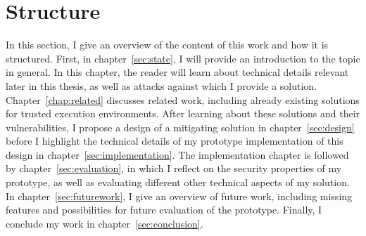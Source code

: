 \section{Structure}
\label{sec:10_structure}

In this section, I give an overview of the content of this work and how it is
structured. First, in chapter~\ref{sec:state}, I will provide an introduction to
the topic in general. In this chapter, the reader will learn about technical
details relevant later in this thesis, as well as attacks against which I
provide a solution. Chapter~\ref{chap:related} discusses related work, including
already existing solutions for trusted execution environments. After learning
about these solutions and their vulnerabilities, I propose a design of a
mitigating solution in chapter~\ref{sec:design} before I highlight the technical
details of my prototype implementation of this design in
chapter~\ref{sec:implementation}. The implementation chapter is followed by
chapter~\ref{sec:evaluation}, in which I reflect on the security properties of
my prototype, as well as evaluating different other technical aspects of my
solution. In chapter~\ref{sec:futurework}, I give an overview of future work,
including missing features and possibilities for future evaluation of the
prototype. Finally, I conclude my work in chapter~\ref{sec:conclusion}.
